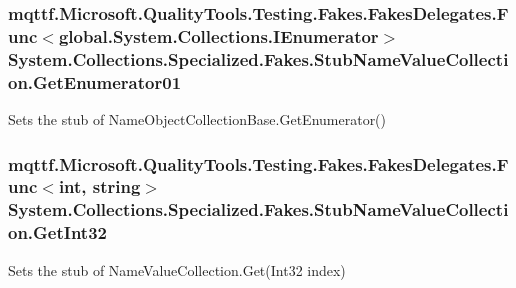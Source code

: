 \hypertarget{class_system_1_1_collections_1_1_specialized_1_1_fakes_1_1_stub_name_value_collection_a6283e78913507fe384d228395ac4103e}{
\subsubsection[{Get\-Enumerator01}]{\setlength{\rightskip}{0pt plus 5cm}mqttf.\-Microsoft.\-Quality\-Tools.\-Testing.\-Fakes.\-Fakes\-Delegates.\-Func$<$global.\-System.\-Collections.\-I\-Enumerator$>$ System.\-Collections.\-Specialized.\-Fakes.\-Stub\-Name\-Value\-Collection.\-Get\-Enumerator01}}\label{class_system_1_1_collections_1_1_specialized_1_1_fakes_1_1_stub_name_value_collection_a6283e78913507fe384d228395ac4103e}


Sets the stub of Name\-Object\-Collection\-Base.\-Get\-Enumerator()

\hypertarget{class_system_1_1_collections_1_1_specialized_1_1_fakes_1_1_stub_name_value_collection_ab75223c0b01ad67d3f89377209e4b978}{
\subsubsection[{Get\-Int32}]{\setlength{\rightskip}{0pt plus 5cm}mqttf.\-Microsoft.\-Quality\-Tools.\-Testing.\-Fakes.\-Fakes\-Delegates.\-Func$<$int, string$>$ System.\-Collections.\-Specialized.\-Fakes.\-Stub\-Name\-Value\-Collection.\-Get\-Int32}}\label{class_system_1_1_collections_1_1_specialized_1_1_fakes_1_1_stub_name_value_collection_ab75223c0b01ad67d3f89377209e4b978}


Sets the stub of Name\-Value\-Collection.\-Get(\-Int32 index)

